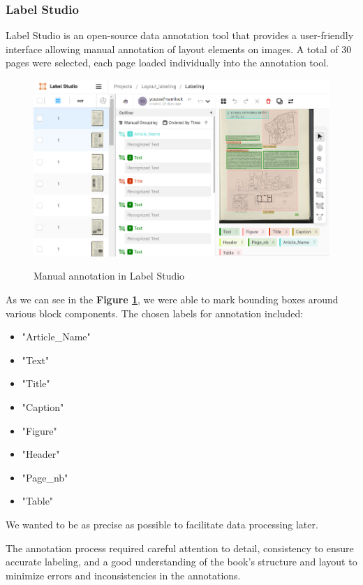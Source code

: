 \subsubsection{Label Studio}
Label Studio \parencite{Label} is an open-source data annotation tool that provides a user-friendly interface allowing manual annotation of layout elements on images.
A total of 30 pages were selected, each page loaded individually into the annotation tool. \\[0.3cm]

\begin{figure}[H]
    \centering
    \scalebox{0.9} 
    {\includegraphics{Images/label_studio.png}}
    \caption{Manual annotation in Label Studio}
    \label{fig:label_studio}
\end{figure}

As we can see in the \textbf{Figure \ref{fig:label_studio}}, we were able to mark bounding boxes around various block components.
The chosen labels for annotation included:
\begin{itemize}
    \item "Article\_Name"
    \item "Text"
    \item "Title"
    \item "Caption"
    \item "Figure"
    \item "Header"
    \item "Page\_nb"
    \item "Table"
\end{itemize}

We wanted to be as precise as possible to facilitate data processing later.

The annotation process required careful attention to detail, consistency to ensure accurate labeling, and a good understanding of the book's structure and layout to minimize errors and inconsistencies in the annotations.

